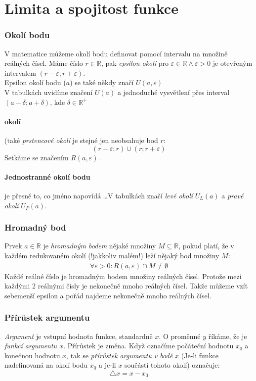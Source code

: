 \documentclass[12pt]{article}
\newcommand{\nR}{\mathbb{R}} %
\begin{document}
\section{Limita a spojitost funkce}
\subsubsection{Okolí bodu}
V matematice můžeme okolí bodu definovat pomocí intervalu na množině reálných čísel. Máme číslo $r\in \nR$, pak \emph{epsilon okolí} pro $\varepsilon \in \nR \land \varepsilon > 0$ je otevřeným intervalem $(r- \varepsilon; r + \varepsilon)$.\\
Epsilon okolí bodu ($a$) se také někdy značí $U(a, \varepsilon)$\\
V tabulkách uvidíme značení $U(a)$ a jednoduché vysvětlení přes interval $(a-\delta ;a +\delta )$, kde $\delta \in \nR^{+}$
\paragraph{okolí} (také \emph{prstencové okolí} je stejné jen neobsahuje bod $r$:
\begin{equation}
 (r-\varepsilon; r) \cup (r; r + \varepsilon)
\end{equation}
Setkáme se značením $R(a, \varepsilon )$.
\paragraph{Jednostranné okolí bodu} je přesně to, co jméno napovídá \dots V tabulkách značí \emph{levé okolí} $U_L(a)$ a \emph{pravé okolí} $U_P(a)$.
\subsubsection{Hromadný bod}
\label{sec:hromadny_bod}
Prvek $a \in \nR$ je \emph{hromadným bodem} nějaké množiny $M \subseteq \nR$, pokud platí, že v každém redukovaném okolí (!jakkoliv malém!) leží nějaký bod množiny $M$:
\begin{align}
\forall \varepsilon > 0: R(a, \varepsilon) \cap M \neq \emptyset
\end{align}
Každé reálné číslo je hromadným bodem množiny reálných čísel. Protože mezi každými 2 reálnými čísly je nekonečně mnoho reálných čísel. Takže můžeme vzít sebemenší epsilon a pořád najdeme nekonečně mnoho reálných čísel.
\subsubsection{Přírůstek argumentu}
\emph{Argument} je vstupní hodnota funkce, standardně $x$. O proměnné $y$ říkáme, že je \emph{funkcí argumentu $x$}. Přírůstek je změna. Když označíme počáteční hodnotu $x_0$ a konečnou hodnotu $x$, tak se \emph{přírůstek argumentu v bodě $x$} (Je-li funkce nadefinovaná na okolí bodu $x_0$ a je-li $x$ součástí tohoto okolí) označuje:
\begin{equation}
\triangle x = x - x_0
\end{equation}
\end{document}
